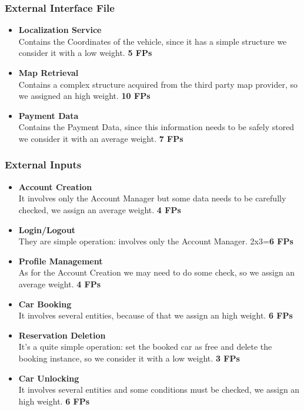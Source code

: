 \subsubsection{External Interface File}
\begin{itemize}
    \item \textbf{Localization Service}\\
    Contains the Coordinates of the vehicle, since it has a simple structure we consider it with a low weight.
    \hfill
    \textbf{5 FPs}
    
    \item \textbf{Map Retrieval}\\
    Contains a complex structure acquired from the third party map provider, so we assigned an high weight.
    \hfill
    \textbf{10 FPs}
    
    \item \textbf{Payment Data}\\
    Contains the Payment Data, since this information needs to be safely stored we consider it with an average weight.
    \hfill
    \textbf{7 FPs}
\end{itemize}


\subsubsection{External Inputs}
\begin{itemize}
    \item \textbf{Account Creation}\\
    It involves only the Account Manager but some data needs to be carefully checked, we assign an average weight.
    \hfill
    \textbf{4 FPs}
    
    \item \textbf{Login/Logout}\\
    They are simple operation: involves only the Account Manager.
    \hfill
    2x3=\textbf{6 FPs}
    
    \item \textbf{Profile Management}\\
    As for the Account Creation we may need to do some check, so we assign an average weight.
    \hfill
    \textbf{4 FPs}
    
    \item \textbf{Car Booking}\\
    It involves several entities, because of that we assign an high weight.
    \hfill
    \textbf{6 FPs}
    
    \item \textbf{Reservation Deletion}\\
    It's a quite simple operation: set the booked car as free and delete the booking instance, so we consider it with a low weight.
    \hfill
    \textbf{3 FPs}
    
    \item \textbf{Car Unlocking}\\
    It involves several entities and some conditions must be checked, we assign an high weight.
    \hfill
    \textbf{6 FPs}
\end{itemize}


